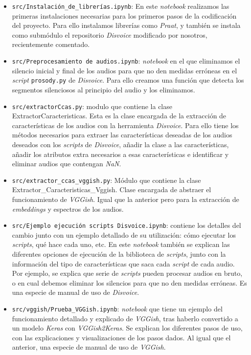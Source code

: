 \begin{itemize}
\item \texttt{src/Instalación\_de\_librerías.ipynb}: En este \textit{notebook} realizamos las primeras instalaciones necesarias para los primeros pasos de la codificación del proyecto. Para ello instalamos librerías como \textit{Praat}, y también se instala como submódulo el repositorio \textit{Disvoice} modificado por nosotros, recientemente comentado.
\item \texttt{src/Preprocesamiento de audios.ipynb}: \textit{notebook} en el que eliminamos el silencio inicial y final de los audios para que no den medidas erróneas en el \textit{script} \texttt{prosody.py} de \textit{Disvoice}. Para ello creamos una función que detecta los segmentos silenciosos al principio del audio y los eliminamos.
\item \texttt{src/extractorCcas.py}: modulo que contiene la clase ExtractorCaracteristicas. Esta es la clase encargada de la extracción de características de los audios con la herramienta \textit{Disvoice}. Para ello tiene los métodos necesarios para extraer las características deseadas de los audios deseados con los \textit{scripts} de \textit{Disvoice}, añadir la clase a las características, añadir los atributos extra necesarios a esas características e identificar y eliminar audios que contengan \textit{NaN}.
\item \texttt{src/extractor\_ccas\_vggish.py}: Módulo que contiene la clase Extractor\_Caracteristicas\_Vggish. Clase encargada de abstraer el funcionamiento de \textit{VGGish}. Igual que la anterior pero para la extracción de \textit{embeddings} y espectros de los audios.
\item \texttt{src/Ejemplo ejecución scripts Disvoice.ipynb}: contiene los detalles del cambio junto con un ejemplo detallado de su utilización: cómo ejecutar los \textit{scripts}, qué hace cada uno, etc. En este \textit{notebook} también se explican las diferentes opciones de ejecución de la biblioteca de \textit{scripts}, junto con la información del tipo de características que saca cada \textit{script} de cada audio. Por ejemplo, se explica que serie de \textit{scripts} pueden procesar audios en bruto, o en cual debemos eliminar los silencios para que no den medidas erróneas. Es una especie de manual de uso de \textit{Disvoice}.
\item \texttt{src/vggish/Prueba\_VGGish.ipynb}: \textit{notebook} que tiene un ejemplo del funcionamiento detallado y explicado de \textit{VGGish}, tras haberlo convertido a un modelo \textit{Keras} con \textit{VGGish2Keras}. Se explican los diferentes pasos de uso, con las explicaciones y visualizaciones de los pasos dados. Al igual que el anterior, una especie de manual de uso de \textit{VGGish}.

\end{itemize}
